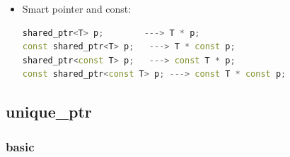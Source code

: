 \documentclass[a4paper,12pt,twoside]{book}
\begin{document}
\begin{itemize}
\item Smart pointer and const:
\begin{lstlisting}[frame=single, language=c++]
shared_ptr<T> p;        ---> T * p;
const shared_ptr<T> p;   ---> T * const p;
shared_ptr<const T> p;   ---> const T * p;
const shared_ptr<const T> p; ---> const T * const p;
\end{lstlisting}

\end{itemize}

\subsection{unique\_ptr}

\subsubsection{basic}
\end{document}

